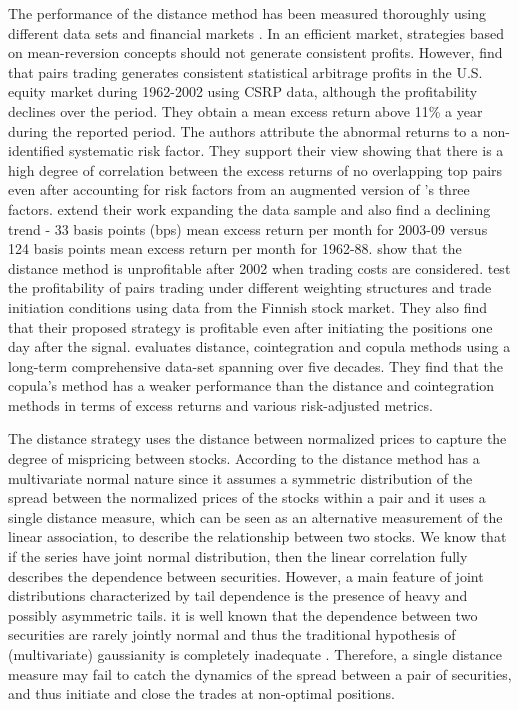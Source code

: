 \documentclass[a4paper]{article}
\begin{document}
	The performance of the distance method has been measured thoroughly using different data sets and financial markets \citep{ggr06,p09,df10,df12,bv12,cm13,rf15}. In an efficient market, strategies based on mean-reversion concepts should not generate consistent profits. However, \citet*{ggr06} find that pairs trading generates consistent statistical arbitrage profits in the U.S. equity market during 1962-2002 using CSRP data, although the profitability declines over the period. They obtain a mean excess return above 11\% a year during the reported period. The authors attribute the abnormal returns to a non-identified systematic risk factor. They support their view showing that there is a high degree of correlation between the excess returns of no overlapping top pairs even after accounting for risk factors from an augmented version of \citet*{ff93}'s three factors. \citet*{df10} extend their work expanding the data sample and also find a declining trend - 33 basis points (bps) mean excess return per month for 2003-09 versus 124 basis points mean excess return per month for 1962-88. \citet*{df12} show that the distance method is unprofitable after 2002 when trading costs are considered. \citet*{bv12} test the profitability of pairs trading under different weighting structures and trade initiation conditions using data from the Finnish stock market. They also find that their proposed strategy is profitable even after initiating the positions one day after the signal. \citet*{rf15} evaluates distance, cointegration and copula methods using a long-term comprehensive data-set spanning over five decades. They find that the copula's method has a weaker performance than the distance and cointegration methods in terms of excess returns and various risk-adjusted metrics.
	
The distance strategy \citep{ggr06} uses the distance between normalized prices to capture the degree of mispricing between stocks. According to \citet*{xie14} the distance method has a multivariate normal nature since it assumes a symmetric distribution of the spread between the normalized prices of the stocks within a pair and it uses a single distance measure, which can be seen as an alternative measurement of the linear association, to describe the relationship between two stocks. We know that if the series have joint normal distribution, then the linear correlation fully describes the dependence between securities. However, a main feature of joint distributions characterized by tail dependence is the presence of heavy and possibly asymmetric tails. it is well known that the dependence between two securities are rarely jointly normal and thus the traditional hypothesis of (multivariate) gaussianity is completely inadequate  \citep{campbell97,cont01,ane03,mcneil15}.  Therefore, a single distance measure may fail to catch the dynamics of the spread between a pair of securities, and thus initiate and close the trades at non-optimal positions.
	
\end{document}
